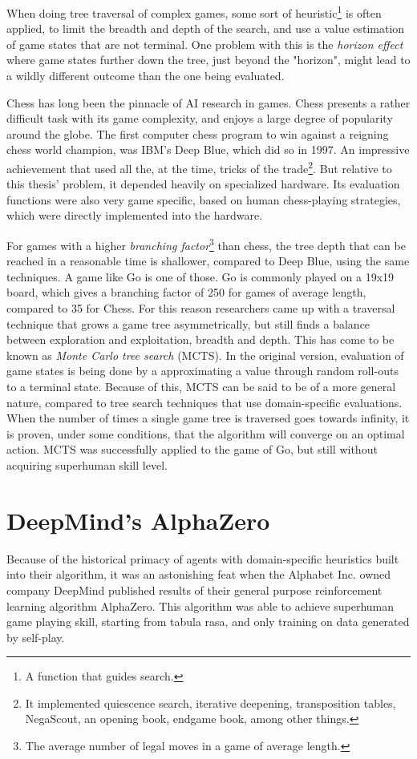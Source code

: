 When doing tree traversal of complex games, some sort of heuristic\footnote{A function that guides search.} is often applied, to limit the breadth and depth of the search, and use a value estimation of game states that are not terminal. One problem with this is the \textit{horizon effect} where game states further down the tree, just beyond the "horizon", might lead to a wildly different outcome than the one being evaluated.

Chess has long been the pinnacle of AI research in games. Chess presents a rather difficult task with its game complexity, and enjoys a large degree of popularity around the globe. The first computer chess program to win against a reigning chess world champion, was IBM's Deep Blue, which did so in 1997. An impressive achievement that used all the, at the time, tricks of the trade\footnote{It implemented quiescence search, iterative deepening, transposition tables, NegaScout, an opening book, endgame book, among other things.}. But relative to this thesis' problem, it depended heavily on specialized hardware. Its evaluation functions were also very game specific, based on human chess-playing strategies, which were directly implemented into the hardware\cite{Campbell2002}.

For games with a higher \textit{branching factor}\footnote{The average number of legal moves in a game of average length.} than chess, the tree depth that can be reached in a reasonable time is shallower, compared to Deep Blue, using the same techniques. A game like Go is one of those. Go is commonly played on a 19x19 board, which gives a branching factor of 250 for games of average length, compared to 35 for Chess. For this reason researchers came up with a traversal technique that grows a game tree asymmetrically, but still finds a balance between exploration and exploitation, breadth and depth. This has come to be known as \textit{Monte Carlo tree search} (MCTS). In the original version, evaluation of game states is being done by a approximating a value through random roll-outs to a terminal state. Because of this, MCTS can be said to be of a more general nature, compared to tree search techniques that use domain-specific evaluations. When the number of times a single game tree is traversed goes towards infinity, it is proven, under some conditions, that the algorithm will converge on an optimal action\cite{Coulom2009}. MCTS was successfully applied to the game of Go, but still without acquiring superhuman skill level.

\section{DeepMind's AlphaZero}
Because of the historical primacy of agents with domain-specific heuristics built into their algorithm, it was an astonishing feat when the Alphabet Inc. owned company DeepMind published results of their general purpose reinforcement learning algorithm AlphaZero. This algorithm was able to achieve superhuman game playing skill, starting from tabula rasa, and only training on data generated by self-play\cite{Silver2018}.

